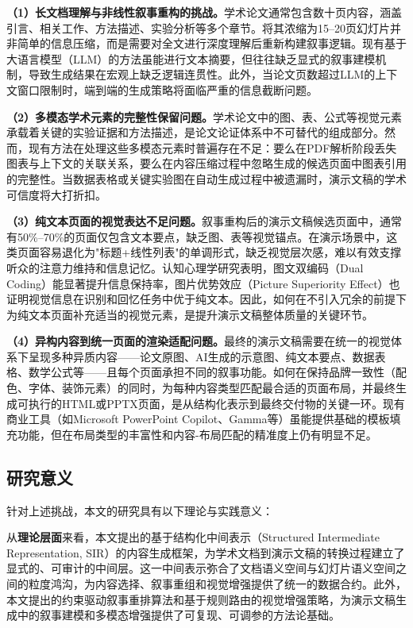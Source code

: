 \textbf{（1）长文档理解与非线性叙事重构的挑战。}学术论文通常包含数十页内容，涵盖引言、相关工作、方法描述、实验分析等多个章节。将其浓缩为15--20页幻灯片并非简单的信息压缩，而是需要对全文进行深度理解后重新构建叙事逻辑。现有基于大语言模型（LLM）的方法虽能进行文本摘要，但往往缺乏显式的叙事建模机制，导致生成结果在宏观上缺乏逻辑连贯性\cite{zheng2025pptagent}。此外，当论文页数超过LLM的上下文窗口限制时，端到端的生成策略将面临严重的信息截断问题。

\textbf{（2）多模态学术元素的完整性保留问题。}学术论文中的图、表、公式等视觉元素承载着关键的实验证据和方法描述，是论文论证体系中不可替代的组成部分。然而，现有方法在处理这些多模态元素时普遍存在不足：要么在PDF解析阶段丢失图表与上下文的关联关系\cite{wang2024paper2ppt}，要么在内容压缩过程中忽略生成的候选页面中图表引用的完整性。当数据表格或关键实验图在自动生成过程中被遗漏时，演示文稿的学术可信度将大打折扣。

\textbf{（3）纯文本页面的视觉表达不足问题。}叙事重构后的演示文稿候选页面中，通常有50\%--70\%的页面仅包含文本要点，缺乏图、表等视觉锚点。在演示场景中，这类页面容易退化为"标题+线性列表"的单调形式，缺乏视觉层次感，难以有效支撑听众的注意力维持和信息记忆。认知心理学研究表明，图文双编码（Dual Coding）能显著提升信息保持率\cite{paivio1986mental}，图片优势效应（Picture Superiority Effect）也证明视觉信息在识别和回忆任务中优于纯文本\cite{shepard1967recognition}。因此，如何在不引入冗余的前提下为纯文本页面补充适当的视觉元素，是提升演示文稿整体质量的关键环节。

\textbf{（4）异构内容到统一页面的渲染适配问题。}最终的演示文稿需要在统一的视觉体系下呈现多种异质内容——论文原图、AI生成的示意图、纯文本要点、数据表格、数学公式等——且每个页面承担不同的叙事功能。如何在保持品牌一致性（配色、字体、装饰元素）的同时，为每种内容类型匹配最合适的页面布局，并最终生成可执行的HTML或PPTX页面，是从结构化表示到最终交付物的关键一环\cite{zheng2025pptagent,tang2024slidegen}。现有商业工具（如Microsoft PowerPoint Copilot、Gamma等）虽能提供基础的模板填充功能，但在布局类型的丰富性和内容-布局匹配的精准度上仍有明显不足。

\subsection{研究意义}

针对上述挑战，本文的研究具有以下理论与实践意义：

从\textbf{理论层面}来看，本文提出的基于结构化中间表示（Structured Intermediate Representation, SIR）的内容生成框架，为学术文档到演示文稿的转换过程建立了显式的、可审计的中间层。这一中间表示弥合了文档语义空间与幻灯片语义空间之间的粒度鸿沟，为内容选择、叙事重组和视觉增强提供了统一的数据合约。此外，本文提出的约束驱动叙事重排算法和基于规则路由的视觉增强策略，为演示文稿生成中的叙事建模和多模态增强提供了可复现、可调参的方法论基础。

